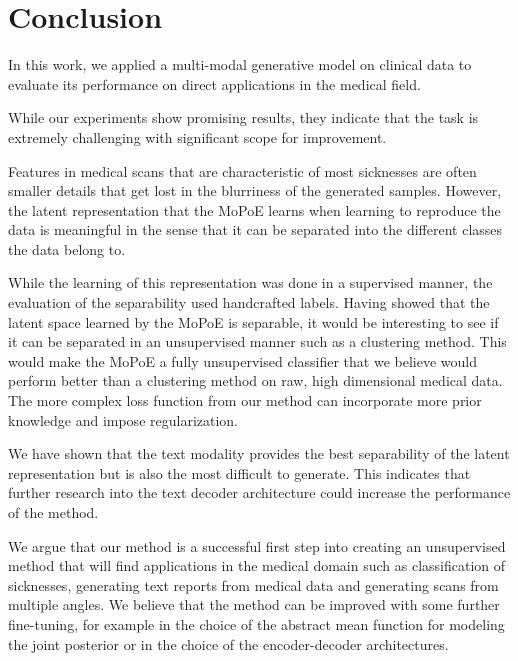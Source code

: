 \section{Conclusion}
In this work, we applied a multi-modal generative model on clinical data to evaluate its performance on direct applications in the medical field.

While our experiments show promising results, they indicate that the task is extremely challenging with significant scope for improvement.

Features in medical scans that are characteristic of most sicknesses are often smaller details that get lost in the blurriness of the generated samples.
However, the latent representation that the MoPoE learns when learning to reproduce the data is meaningful in the sense that it can be separated into the different classes the data belong to.


While the learning of this representation was done in a supervised manner, the evaluation of the separability used handcrafted labels.
Having showed that the latent space learned by the MoPoE is separable, it would be interesting to see if it can be separated in an unsupervised manner such as a clustering method.
This would make the MoPoE a fully unsupervised classifier that we believe would perform better than a clustering method on raw, high dimensional medical data.
The more complex loss function from our method can incorporate more prior knowledge and impose regularization.


We have shown that the text modality provides the best separability of the latent representation but is also the most difficult to generate.
This indicates that further research into the text decoder architecture could increase the performance of the method.



We argue that our method is a successful first step into creating an unsupervised method that will find applications in the medical domain such as classification of sicknesses, generating text reports from medical data and generating scans from multiple angles.
We believe that the method can be improved with some further fine-tuning, for example in the choice of the abstract mean function for modeling the joint posterior or in the choice of the encoder-decoder architectures.